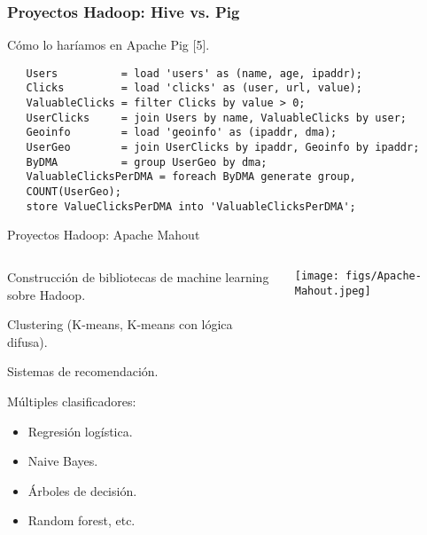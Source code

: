\begin{frame}[fragile]
  \frametitle{Proyectos Hadoop: Hive vs. Pig}
    \begin{wideitemize}
      \item Cómo lo haríamos en Apache Pig [5].
    \end{wideitemize}
  \fontsize{8pt}{12pt}\selectfont
  \begin{verbatim}
   Users          = load 'users' as (name, age, ipaddr);
   Clicks         = load 'clicks' as (user, url, value);
   ValuableClicks = filter Clicks by value > 0;
   UserClicks     = join Users by name, ValuableClicks by user;
   Geoinfo        = load 'geoinfo' as (ipaddr, dma);
   UserGeo        = join UserClicks by ipaddr, Geoinfo by ipaddr;
   ByDMA          = group UserGeo by dma;
   ValuableClicksPerDMA = foreach ByDMA generate group, 
   COUNT(UserGeo);
   store ValueClicksPerDMA into 'ValuableClicksPerDMA';
  \end{verbatim}

\end{frame}


\begin{frame}{Proyectos Hadoop: Apache Mahout}
 \begin{columns}[T]
    \begin{column}{.8\textwidth}
     \begin{wideitemize}
      \item Construcción de bibliotecas de machine learning sobre Hadoop.
      \item Clustering (K-means, K-means con lógica difusa).
      \item Sistemas de recomendación.
      \item Múltiples clasificadores:
      \begin{itemize}
       \item Regresión logística.
       \item Naive Bayes.
       \item Árboles de decisión.
       \item Random forest, etc. 
      \end{itemize}

    \end{wideitemize}
    \end{column}
    \begin{column}{.2\textwidth}
    \vspace*{.7cm}
    \texttt{[image: figs/Apache-Mahout.jpeg]}
    \end{column}
  \end{columns}

\end{frame}

